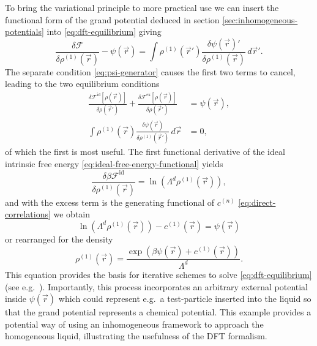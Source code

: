To bring the variational principle to more practical use we can insert the functional form of the grand potential deduced in section \ref{sec:inhomogeneous-potentials} into \eqref{eq:dft-equilibrium} giving
\begin{equation*}
  \frac{\delta \mathcal{F}}{\delta \rho^{(1)}(\vec{r})}
  - \psi(\vec{r})
  =
  \int
  \rho^{(1)}(\vec{r}') \frac{\delta \psi(\vec{r})'}{\delta \rho^{(1)}(\vec{r})}
  \, d\vec{r}'.
\end{equation*}
The separate condition \eqref{eq:psi-generator} causes the first two terms to cancel, leading to the two equilibrium conditions
\begin{subequations}
  \begin{align}
    \label{eq:fmt-psi-equilibrium}
    \frac{\delta \mathcal{F}^\mathrm{id}[\rho(\vec{r})]}{\delta \rho(\vec{r}')}
    + \frac{\delta \mathcal{F}^\mathrm{ex}[\rho(\vec{r})]}{\delta \rho(\vec{r}')}
    &=
    \psi(\vec{r}),
    \\
    \int
    \rho^{(1)}(\vec{r}) \frac{\delta \psi(\vec{r})}{\delta \rho^{(1)}(\vec{r}')}
    \, d\vec{r}
    &=
    0,
  \end{align}
\end{subequations}
of which the first is most useful.
The first functional derivative of the ideal intrinsic free energy \eqref{eq:ideal-free-energy-functional} yields
\begin{equation*}
  \frac{
    \delta \beta \mathcal{F}^\mathrm{id}
  }{
    \delta \rho^{(1)}(\vec{r})
  }
  =
  \ln{(\Lambda^d \rho^{(1)}(\vec{r}))},
\end{equation*}
and with the excess term is the generating functional of $c^{(n)}$ \eqref{eq:direct-correlations} we obtain
\begin{equation*}
  \ln{(\Lambda^d \rho^{(1)}(\vec{r}))}
  - c^{(1)}(\vec{r})
  =
  \psi(\vec{r})
\end{equation*}
or rearranged for the density
\begin{equation}\label{eq:equilibrium-density}
  \rho^{(1)}(\vec{r})
  =
  \frac{
    \exp{\left(\beta\psi(\vec{r}) + c^{(1)}(\vec{r})\right)}
  }{ \Lambda^d }.
\end{equation}
This equation provides the basis for iterative schemes to solve \eqref{eq:dft-equilibrium} (see e.g.\ \cite{RothJPCM2010}).
Importantly, this process incorporates an arbitrary external potential inside $\psi(\vec{r})$ which could represent e.g.\ a test-particle inserted into the liquid so that the grand potential represents a chemical potential.
This example provides a potential way of using an inhomogeneous framework to approach the homogeneous liquid, illustrating the usefulness of the DFT formalism.

